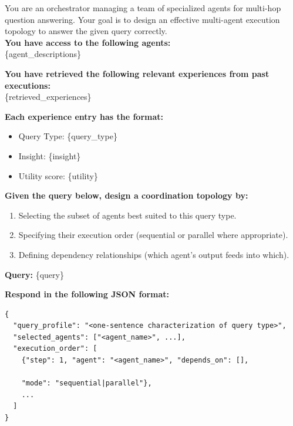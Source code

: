 \begin{tcolorbox}[
    colback=promptbg!100!white,
    sharp corners=south, 
    boxrule=0.25mm, 
    fonttitle=\bfseries, 
    title={\textbf{Orchestrator: topology sampling}}, 
    width=\textwidth, 
    enhanced,
    drop shadow
    ]


You are an orchestrator managing a team of specialized agents for multi-hop 
question answering. Your goal is to design an effective multi-agent execution topology 
to answer the given query correctly. \\[2mm]
\textbf{You have access to the following agents:} \\
\{agent\_descriptions\}

\vspace{0.5em}
\textbf{You have retrieved the following relevant experiences from past executions:} \\
\{retrieved\_experiences\}

\vspace{0.5em}
\textbf{Each experience entry has the format:}
\begin{itemize}
    \item Query Type: \{query\_type\}
    \item Insight: \{insight\}
    \item Utility score: \{utility\}
\end{itemize}

\vspace{0.5em}
\textbf{Given the query below, design a coordination topology by:}
\begin{enumerate}
    \item Selecting the subset of agents best suited to this query type.
    \item Specifying their execution order (sequential or parallel where appropriate).
    \item Defining dependency relationships (which agent's output feeds into which).
\end{enumerate}

\vspace{0.5em}
\textbf{Query:} \{query\}

\vspace{0.5em}
\textbf{Respond in the following JSON format:}
\begin{verbatim}
{
  "query_profile": "<one-sentence characterization of query type>",
  "selected_agents": ["<agent_name>", ...],
  "execution_order": [
    {"step": 1, "agent": "<agent_name>", "depends_on": [],
    
    "mode": "sequential|parallel"},
    ...
  ]
}
\end{verbatim}
\end{tcolorbox}


